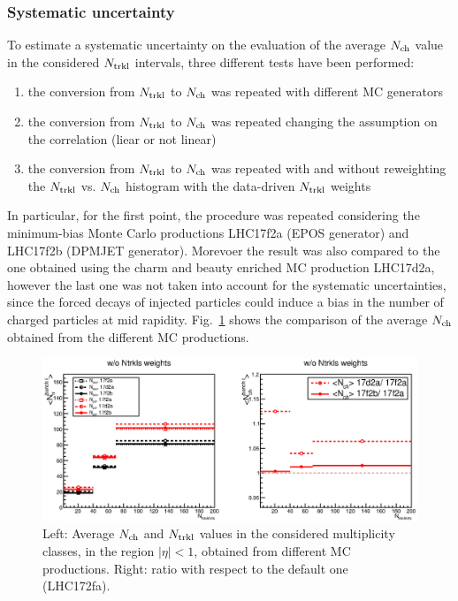 \subsubsection{Systematic uncertainty}
To estimate a systematic uncertainty on the evaluation of the average $N_{\rm ch}$ value in the considered $N_{\rm trkl}$ intervals, three different tests have been performed:
\begin{enumerate}
\item the conversion from $N_{\rm trkl}$ to $N_{\rm ch}$ was repeated with different MC generators 
\item the conversion from $N_{\rm trkl}$ to $N_{\rm ch}$ was repeated changing the assumption on the correlation (liear or not linear)
\item the conversion from $N_{\rm trkl}$ to $N_{\rm ch}$ was repeated with and without reweighting the $N_{\rm trkl}$ vs. $N_{\rm ch}$ histogram with the data-driven $N_{\rm trkl}$ weights
\end{enumerate}

In particular, for the first point, the procedure was repeated considering the minimum-bias Monte Carlo productions LHC17f2a (EPOS generator) and LHC17f2b (DPMJET generator). Morevoer the result was also compared to the one obtained using the charm and beauty enriched MC production LHC17d2a, however the last one was not taken into account for the systematic uncertainties, since the forced decays of injected particles could induce a bias in the number of charged particles at mid rapidity. Fig.~\ref{fig:NchVsMCgenerator} shows the comparison of the average $N_{\rm ch}$ obtained from the different MC productions.

\begin{figure}[htpb]
\centering
 \includegraphics[width=.9\textwidth]{FigCap6/comparisonNtrkl_17f2b_17d2a_17f2a.eps}
 \caption{Left: Average $N_{\rm ch}$ and $N_{\rm trkl}$ values in the considered multiplicity classes, in the region $|\eta |< 1$, obtained from different MC productions. Right: ratio with respect to the default one (LHC172fa).}
 \label{fig:NchVsMCgenerator}
 \end{figure}

